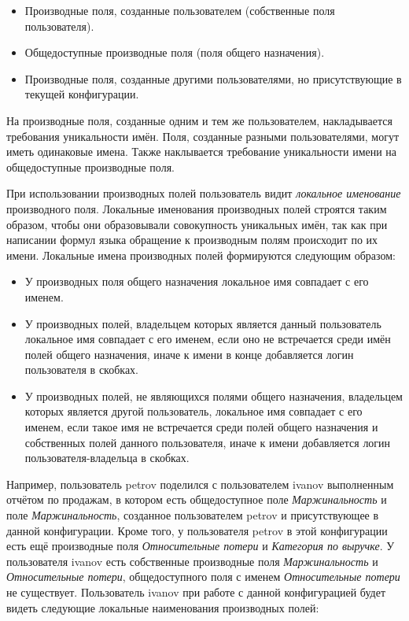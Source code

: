 \documentclass[../user-manual.tex]{subfiles}
\begin{document}
	\begin{itemize}
		\item Производные поля, созданные пользователем (собственные поля пользователя).
		
		\item Общедоступные производные поля (поля общего назначения).
		
		\item Производные поля, созданные другими пользователями, но присутствующие в текущей конфигурации.
		
	\end{itemize}
	
	На производные поля, созданные одним и тем же пользователем, накладывается требования уникальности имён. Поля, созданные разными пользователями, могут иметь одинаковые имена. Также наклывается требование уникальности имени на общедоступные производные поля.
	
	При использовании производных полей пользователь видит \textit{локальное именование} производного поля. Локальные именования производных полей строятся таким образом, чтобы они образовывали совокупность уникальных имён, так как при написании формул языка обращение к производным полям происходит по их имени. Локальные имена производных полей формируются следующим образом:
	
	\begin{itemize}
		
		\item У производных поля общего назначения локальное имя совпадает с его именем.
		
		\item У производных полей, владельцем которых является данный пользователь локальное имя совпадает с его именем, если оно не встречается среди имён полей общего назначения, иначе к имени в конце добавляется логин пользователя в скобках.
		
		\item У производных полей, не являющихся полями общего назначения, владельцем которых является другой пользователь, локальное имя совпадает с его именем, если такое имя не встречается среди полей общего назначения и собственных полей данного пользователя, иначе к имени добавляется логин пользователя-владельца в скобках.
		
	\end{itemize}
	
	Например, пользователь petrov поделился с пользователем ivanov выполненным отчётом по продажам, в котором есть общедоступное поле \textit{Маржинальность} и поле \textit{Маржинальность}, созданное пользователем petrov и присутствующее в данной конфигурации. Кроме того, у пользователя petrov в этой конфигурации есть ещё производные поля \textit{Относительные потери} и \textit{Категория по выручке}. У пользователя ivanov есть собственные производные поля \textit{Маржинальность} и \textit{Относительные потери}, общедоступного поля с именем \textit{Относительные потери} не существует. Пользователь ivanov при работе с данной конфигурацией будет видеть следующие локальные наименования производных полей:
	
\end{document}
